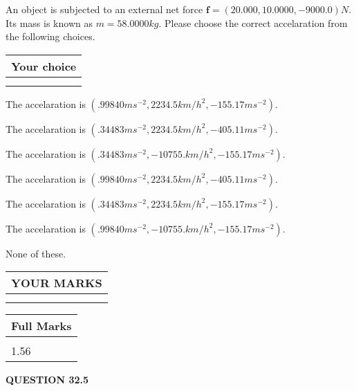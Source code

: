 \documentclass[12pt]{article}
\begin{document}
  
 
An object is subjected to an external net force $\mathbf{f}=(
20.000 ,
10.0000,
-9000.0  )N$. Its mass is known as
$m= %
58.0000  kg$. Please choose the correct accelaration
from the following choices.
 
  
  
\noindent\hspace{3.0in} \begin{tabular}{|l|}
\hline
Your choice \\
\hline
 \\ 
 \\ 
\hline
\end{tabular}
  
  
 
 
The accelaration is
$(
.99840ms^{-2},
2234.5km/h^2,
-155.17ms^{-2}
).
$
 
 
The accelaration is
$(
.34483ms^{-2},
2234.5km/h^2,
-405.11ms^{-2}
).
$
 
 
The accelaration is
$(
.34483ms^{-2},
-10755.km/h^2,
-155.17ms^{-2}
).
$
 
 
The accelaration is
$(
.99840ms^{-2},
2234.5km/h^2,
-405.11ms^{-2}
).
$
 
 
The accelaration is
$(
.34483ms^{-2},
2234.5km/h^2,
-155.17ms^{-2}
).
$
 
 
The accelaration is
$(
.99840ms^{-2},
-10755.km/h^2,
-155.17ms^{-2}
).
$
 
 
 None of these.
 
 
 
 

 
\vspace{0.3in}
  
\vspace{0.2in}
  
\noindent\begin{tabular}{|l|}
\hline
 YOUR MARKS  \\
\hline
 \\ 
 \\ 
\hline
\end{tabular}
\hspace{0.05in} \begin{tabular}{|l|}
\hline
 Full Marks  \\
\hline
 \\ 
1.56 \\
\hline
\end{tabular}
{\textbf{\Large{QUESTION
32.5 
}}}
  
\end{document}
